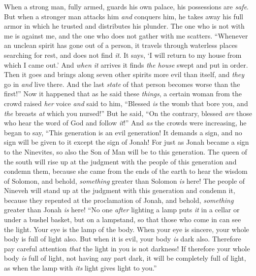 \begin{biblechapter}
\verse When a strong man, fully armed, guards his own palace, his possessions are \textit{safe}.
\verse But when a stronger man attacks him \textit{and} conquers him, he takes away his full armor in which he trusted and distributes his plunder.
\verse The one who is not with me is against me, and the one who does not gather with me scatters.
 “Whenever an unclean spirit has gone out of a person, it travels through waterless places searching for rest, and does not find \textit{it}. It says, ‘I will return to my house from which I came out.’
\verse And \textit{when it} arrives it finds \textit{the house} swept and put in order.
\verse Then it goes and brings along seven other spirits more evil than itself, and \textit{they} go in \textit{and} live there. And the last \textit{state} of that person becomes worse than the first!”
\verse Now it happened that as he said these \textit{things}, a certain woman from the crowd raised \textit{her} voice \textit{and} said to him, “Blessed \textit{is} the womb that bore you, and \textit{the} breasts \textit{at} which you nursed!”
\verse But he said, “On the contrary, blessed \textit{are} those who hear the word of God and follow \textit{it}!”
 And \textit{as} the crowds were increasing, he began to say, “This generation is an evil generation! It demands a sign, and no sign will be given to it except the sign of Jonah!
\verse For just as Jonah became a sign to the Ninevites, so also the Son of Man will be to this generation.
\verse The queen of the south will rise up at the judgment with the people of this generation and condemn them, because she came from the ends of the earth to hear the wisdom of Solomon, and behold, \textit{something} greater than Solomon \textit{is} here!
\verse The people of Nineveh will stand up at the judgment with this generation and condemn it, because they repented at the proclamation of Jonah, and behold, \textit{something} greater than Jonah \textit{is} here!
 “No one \textit{after} lighting a lamp puts \textit{it} in a cellar or under a bushel basket, but on a lampstand, so that those who come in can see the light.
\verse Your eye is the lamp of the body. When your eye is sincere, your whole body is full of light also. But when it is evil, your body \textit{is} dark also.
\verse Therefore pay careful attention \textit{that} the light in you is not darkness!
\verse If therefore your whole body \textit{is} full of light, not having any part dark, it will be completely full of light, as when the lamp with \textit{its} light gives light to you.”

\end{biblechapter}
